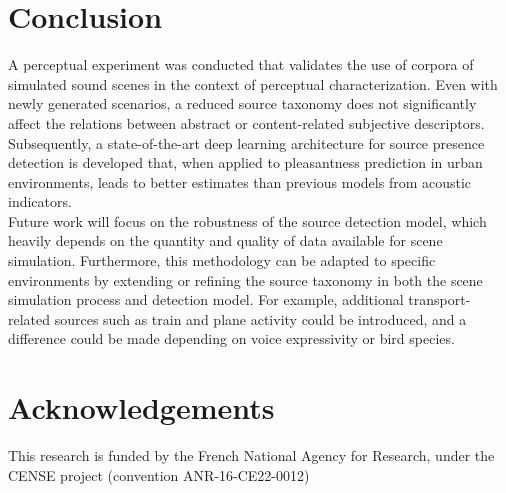 \documentclass[11pt,a4paper]{article}
\begin{document}
\section{Conclusion}
\label{sec:conclusion}

A perceptual experiment was conducted that validates the use of corpora of simulated sound scenes in the context of perceptual characterization. Even with newly generated scenarios, a reduced source taxonomy does not significantly affect the relations between abstract or content-related subjective descriptors.\\

Subsequently, a state-of-the-art deep learning architecture for source presence detection is developed that, when applied to pleasantness prediction in urban environments, leads to better estimates than previous models from acoustic indicators.\\

Future work will focus on the robustness of the source detection model, which heavily depends on the quantity and quality of data available for scene simulation. Furthermore, this methodology can be adapted to specific environments by extending or refining the source taxonomy in both the scene simulation process and detection model. For example, additional transport-related sources such as train and plane activity could be introduced, and a difference could be made depending on voice expressivity or bird species.

\section*{Acknowledgements}
\label{sec:ack}

This research is funded by the French National Agency for Research, under the CENSE project (convention ANR-16-CE22-0012)




\end{document}
